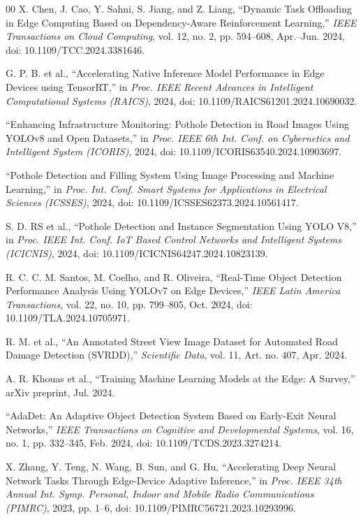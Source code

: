 \documentclass{ieeeaccess}
\begin{document}
\begin{thebibliography}{00}
X. Chen, J. Cao, Y. Sahni, S. Jiang, and Z. Liang,
``Dynamic Task Offloading in Edge Computing Based on Dependency-Aware Reinforcement Learning,''
\textit{IEEE Transactions on Cloud Computing}, vol. 12, no. 2, pp. 594--608, Apr.--Jun. 2024,
doi: 10.1109/TCC.2024.3381646.

G. P. B. et al.,
``Accelerating Native Inference Model Performance in Edge Devices using TensorRT,''
in \textit{Proc. IEEE Recent Advances in Intelligent Computational Systems (RAICS)}, 2024,
doi: 10.1109/RAICS61201.2024.10690032.

``Enhancing Infrastructure Monitoring: Pothole Detection in Road Images Using YOLOv8 and Open Datasets,''
in \textit{Proc. IEEE 6th Int. Conf. on Cybernetics and Intelligent System (ICORIS)}, 2024,
doi: 10.1109/ICORIS63540.2024.10903697.

``Pothole Detection and Filling System Using Image Processing and Machine Learning,''
in \textit{Proc. Int. Conf. Smart Systems for Applications in Electrical Sciences (ICSSES)}, 2024,
doi: 10.1109/ICSSES62373.2024.10561417.

S. D. RS et al.,
``Pothole Detection and Instance Segmentation Using YOLO V8,''
in \textit{Proc. IEEE Int. Conf. IoT Based Control Networks and Intelligent Systems (ICICNIS)}, 2024,
doi: 10.1109/ICICNIS64247.2024.10823139.

R. C. C. M. Santos, M. Coelho, and R. Oliveira,
``Real-Time Object Detection Performance Analysis Using YOLOv7 on Edge Devices,''
\textit{IEEE Latin America Transactions}, vol. 22, no. 10, pp. 799--805, Oct. 2024,
doi: 10.1109/TLA.2024.10705971.

R. M. et al.,
``An Annotated Street View Image Dataset for Automated Road Damage Detection (SVRDD),''
\textit{Scientific Data}, vol. 11, Art. no. 407, Apr. 2024.

A. R. Khouas et al.,
``Training Machine Learning Models at the Edge: A Survey,''
arXiv preprint, Jul. 2024.

``AdaDet: An Adaptive Object Detection System Based on Early-Exit Neural Networks,''
\textit{IEEE Transactions on Cognitive and Developmental Systems}, vol. 16, no. 1,
pp. 332--345, Feb. 2024,
doi: 10.1109/TCDS.2023.3274214.


X. Zhang, Y. Teng, N. Wang, B. Sun, and G. Hu,
``Accelerating Deep Neural Network Tasks Through Edge-Device Adaptive Inference,''
in \textit{Proc. IEEE 34th Annual Int. Symp. Personal, Indoor and Mobile Radio Communications (PIMRC)},
2023, pp. 1--6,
doi: 10.1109/PIMRC56721.2023.10293996.


\end{thebibliography}
\end{document}
